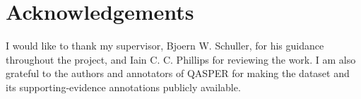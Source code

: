 \chapter*{Acknowledgements}

I would like to thank my supervisor, Bjoern W. Schuller, for his guidance throughout the project, and Iain C. C. Phillips for reviewing the work. I am also grateful to the authors and annotators of QASPER for making the dataset and its supporting-evidence annotations publicly available.

